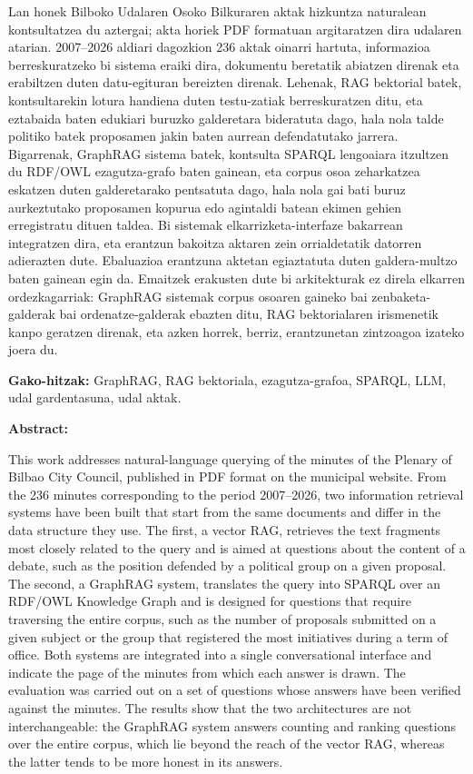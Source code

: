 \documentclass[11pt, a4paper]{report}
\begin{document}
\begin{itshape}
	Lan honek Bilboko Udalaren Osoko Bilkuraren aktak hizkuntza naturalean
	kontsultatzea du aztergai; akta horiek PDF formatuan argitaratzen dira udalaren
	atarian. 2007--2026 aldiari dagozkion 236 aktak oinarri hartuta, informazioa
	berreskuratzeko bi sistema eraiki dira, dokumentu beretatik abiatzen direnak eta
	erabiltzen duten datu-egituran bereizten direnak. Lehenak, RAG bektorial batek,
	kontsultarekin lotura handiena duten testu-zatiak berreskuratzen ditu, eta
	eztabaida baten edukiari buruzko galderetara bideratuta dago, hala nola talde
	politiko batek proposamen jakin baten aurrean defendatutako jarrera. Bigarrenak,
	GraphRAG sistema batek, kontsulta SPARQL lengoaiara itzultzen du RDF/OWL
	ezagutza-grafo baten gainean, eta corpus osoa zeharkatzea eskatzen duten
	galderetarako pentsatuta dago, hala nola gai bati buruz aurkeztutako proposamen
	kopurua edo agintaldi batean ekimen gehien erregistratu dituen taldea. Bi sistemak
	elkarrizketa-interfaze bakarrean integratzen dira, eta erantzun bakoitza aktaren
	zein orrialdetatik datorren adierazten dute. Ebaluazioa erantzuna
	aktetan egiaztatuta duten galdera-multzo baten gainean egin da. Emaitzek
	erakusten dute bi arkitekturak ez direla elkarren ordezkagarriak: GraphRAG sistemak corpus osoaren
	gaineko bai zenbaketa-galderak bai ordenatze-galderak ebazten ditu, RAG bektorialaren
	irismenetik kanpo geratzen direnak, eta azken horrek, berriz, erantzunetan
	zintzoagoa izateko joera du.

	\textbf{Gako-hitzak:} GraphRAG, RAG bektoriala, ezagutza-grafoa, SPARQL, LLM, udal gardentasuna, udal aktak.

	\bigskip
	\normalfont\large\bfseries Abstract:\par\normalsize\mdseries\itshape

	This work addresses natural-language querying of the minutes of the Plenary of
	Bilbao City Council, published in PDF format on the municipal website. From the
	236 minutes corresponding to the period 2007--2026, two information retrieval
	systems have been built that start from the same documents and differ in the data
	structure they use. The first, a vector RAG, retrieves the text fragments most
	closely related to the query and is aimed at questions about the content of a
	debate, such as the position defended by a political group on a given proposal.
	The second, a GraphRAG system, translates the query into SPARQL over an RDF/OWL
	Knowledge Graph and is designed for questions that require traversing the entire
	corpus, such as the number of proposals submitted on a given subject or the group
	that registered the most initiatives during a term of office. Both systems are
	integrated into a single conversational interface and indicate the page of the
	minutes from which each answer is drawn. The evaluation was carried out
	on a set of questions whose answers have been verified against the minutes. The
	results show that the two architectures are not interchangeable: the GraphRAG system answers
	counting and ranking questions over the entire corpus, which lie beyond the reach
	of the vector RAG, whereas the latter tends to be more honest in its answers.


\end{itshape}
\end{document}
